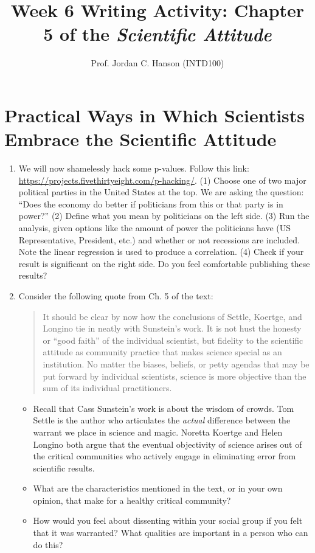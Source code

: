 \documentclass{article}
\begin{document}
\title{Week 6 Writing Activity: Chapter 5 of the \textit{Scientific Attitude}}
\author{Prof. Jordan C. Hanson (INTD100)}

\maketitle

\section{Practical Ways in Which Scientists Embrace the Scientific Attitude}

\begin{enumerate}
\item We will now shamelessly hack some p-values.  Follow this link: \url{https://projects.fivethirtyeight.com/p-hacking/}.  (1) Choose one of two major political parties in the United States at the top.  We are asking the question: ``Does the economy do better if politicians from this or that party is in power?'' (2) Define what you mean by politicians on the left side.  (3) Run the analysis, given options like the amount of power the politicians have (US Representative, President, etc.) and whether or not recessions are included.  Note the linear regression is used to produce a correlation. (4) Check if your result is significant on the right side.  Do you feel comfortable publishing these results? \\ \vspace{1cm}
\item Consider the following quote from Ch. 5 of the text:
\begin{quote}
It should be clear by now how the conclusions of Settle, Koertge, and Longino tie in neatly with Sunstein's work.  It is not hust the honesty or ``good faith'' of the individual scientist, but fidelity to the scientific attitude as community practice that makes science special as an institution.  No matter the biases, beliefs, or petty agendas that may be put forward by individual scientists, science is more objective than the sum of its individual practitioners.
\end{quote}
\begin{itemize}
\item Recall that Cass Sunstein's work is about the wisdom of crowds.  Tom Settle is the author who articulates the \textit{actual} difference between the warrant we place in science and magic.  Noretta Koertge and Helen Longino both argue that the eventual objectivity of science arises out of the critical communities who actively engage in eliminating error from scientific results.
\item What are the characteristics mentioned in the text, or in your own opinion, that make for a healthy critical community? \\ \vspace{3cm}
\item How would you feel about dissenting within your social group if you felt that it was warranted?  What qualities are important in a person who can do this?
\end{itemize}
\end{enumerate}
\end{document}
